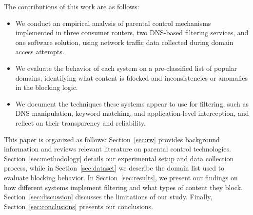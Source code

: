 The contributions of this work are as follows:
\begin{itemize}
    \item We conduct an empirical analysis of parental control mechanisms implemented in three consumer routers, two DNS-based filtering services, and one software solution, using network traffic data collected during domain access attempts.
    \item We evaluate the behavior of each system on a pre-classified list of popular domains, identifying what content is blocked and inconsistencies or anomalies in the blocking logic.
    \item We document the techniques these systems appear to use for filtering, such as DNS manipulation, keyword matching, and application-level interception, and reflect on their transparency and reliability.
\end{itemize}


This paper is organized as follows:
Section~\ref{sec:rw} provides background information and reviews relevant literature on parental control technologies. 
Section~\ref{sec:methodology} details our experimental setup and data collection process, while in 
Section~\ref{sec:dataset} we describe the domain list used to evaluate blocking behavior. 
In Section~\ref{sec:results}, we present our findings on how different systems implement filtering and what types of content they block. 
Section~\ref{sec:discussion} discusses the limitations of our study.
Finally, Section~\ref{sec:conclusions} presents our conclusions.
